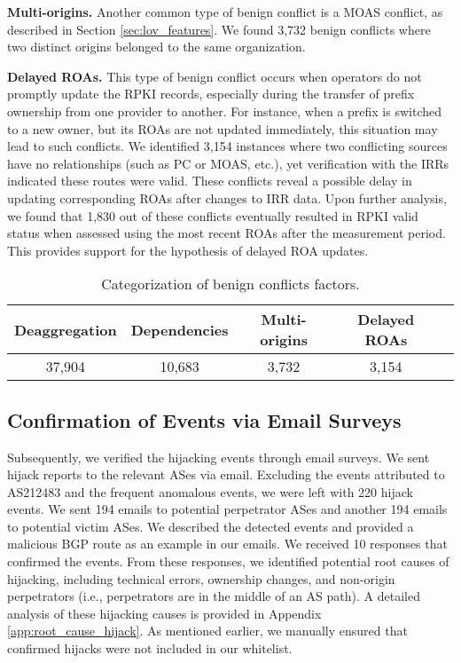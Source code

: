 \noindent\textbf{Multi-origins.} Another common type of benign conflict is a MOAS conflict, as described in Section \ref{sec:lov_features}.
 We found 3,732 benign conflicts where two distinct origins belonged to the same organization.
 
\noindent\textbf{Delayed ROAs.}
This type of benign conflict occurs when operators do not promptly update the RPKI records, especially during the transfer of prefix ownership from one provider to another.
For instance, when a prefix is switched to a new owner, but its ROAs are not updated immediately, this situation may lead to such conflicts.
We identified 3,154 instances where two conflicting sources have no relationships (such as PC or MOAS, etc.), yet verification with the IRRs indicated these routes were valid.
These conflicts reveal a possible delay in updating corresponding ROAs after changes to IRR data.
Upon further analysis, we found that 1,830 out of these conflicts eventually resulted in RPKI valid status when assessed using the most recent ROAs after the measurement period. This provides support for the hypothesis of delayed ROA updates.
\begin{table}[t!]
 \renewcommand{\arraystretch}{1.0}
  \centering
\fontsize{7}{7}
  \begin {tabular}{ccccc}
  \toprule
    \textbf{Deaggregation} & \textbf{Dependencies} & \textbf{Multi-origins} & \textbf{Delayed ROAs} \\
    \midrule
   37,904 & 10,683 & 3,732 & 3,154\\\bottomrule
   \end{tabular}
\caption{\small{Categorization of benign conflicts factors.}}%
\label{tab:benign_conflict_types}
\vspace{-15pt}
\end{table}

\vspace{-10pt}
\subsection{Confirmation of Events via Email Surveys} \label{sec:root_causes_events}
Subsequently, we verified the hijacking events through email surveys.
We sent hijack reports to the relevant ASes via email.
Excluding the events attributed to AS212483 and the frequent anomalous events, we were left with 220 hijack events. We sent 194 emails to potential perpetrator ASes and another 194 emails to potential victim ASes. We described the detected events and provided a malicious BGP route as an example in our emails.
We received 10 responses that confirmed the events.
From these responses, we identified potential root causes of hijacking, including technical errors, ownership changes, and non-origin perpetrators (i.e., perpetrators are in the middle of an AS path).
A detailed analysis of these hijacking causes is provided in Appendix \ref{app:root_cause_hijack}.
As mentioned earlier, we manually ensured that confirmed hijacks were not included in our whitelist.

